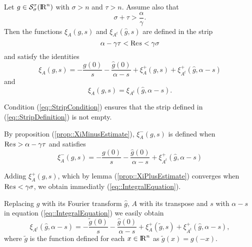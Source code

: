 \documentclass[12pt,a4paper]{amsart}
\begin{document}
{\begin{theorem}\label{thm::FunctionalEquation}
Let ${g}\in{{\mathcal{S}}_{\sigma}^{{\tau}}({{\rm I\kern-.185em R}}^{n})}$
with ${\sigma}>{n}$ and ${\tau}>{n}$.
Assume also that
\begin{equation}\label{eq::StripCondition}
{\sigma}+{\tau}>\frac{\alpha}{\gamma}.
\end{equation}
Then the  functions
${{\xi}_{{A}}\left({g},{s}\right)}$
and
${{\xi}_{{{\left.{{A}}\right.}^t}}\left({\hat{g}},{s}\right)}$
are defined in the strip
\begin{equation}\label{eq::StripDefinition}
{\alpha}-{\gamma}{\tau}<{\mathop{\rm Re}\nolimits}{s}<{\gamma}{\sigma}
\end{equation}
and satisfy the identities
\begin{equation}\label{eq::IntegralEquation}
{{\xi}_{{A}}\left({g},{s}\right)}=
-\frac{{g}(0)}{s}
-\frac{\hat{g}(0)}{{\alpha}-{s}}
+{{\xi}_{{A}}^+\left({g},{s}\right)}
+{{\xi}_{{{\left.{{A}}\right.}^t}}^+\left({\hat{g}},{{\alpha}-{s}}\right)}
\end{equation}
and
\begin{equation}\label{eq::FunctionalEquation}
{{\xi}_{{A}}\left({g},{s}\right)}=
{{\xi}_{{{\left.{{A}}\right.}^t}}\left({\hat{g}},{{\alpha}-{s}}\right)}.
\end{equation}
\end{theorem}

{\removelastskip\par\medskip\goodbreak{}}
Condition (\ref{eq::StripCondition}) ensures that the strip
defined in (\ref{eq::StripDefinition}) is not empty.

By proposition (\ref{prop::XiMinusEstimate}),
${{\xi}_{A}^-\left({g},{s}\right)}$ is defined
when ${\mathop{\rm Re}\nolimits}{s}>{\alpha}-{\gamma}{\tau}$
and satisfies
\begin{equation}\nonumber
{{\xi}_{A}^-\left({g},{s}\right)}=
	-\frac{{g}(0)}{s}
	-\frac{\hat{g}(0)}{{\alpha}-{s}}
	+{{\xi}_{{{\left.{{A}}\right.}^t}}^+\left({\hat{g}},{{\alpha}-{s}}\right)}
\end{equation}

Adding ${{\xi}_{{A}}^+\left({g},{s}\right)}$,
which by lemma (\ref{prop::XiPlusEstimate}) converges
when ${\mathop{\rm Re}\nolimits}{s}<{\gamma}{\sigma}$,
we obtain immediatly (\ref{eq::IntegralEquation}).

Replacing ${g}$ with its Fourier transform $\hat{g}$,
${A}$ with its transpose and
${s}$ with ${\alpha}-{s}$
in equation (\ref{eq::IntegralEquation}) we easily obtain
\begin{equation}\label{eq::IntegralEquationDual}
{{\xi}_{{{\left.{{A}}\right.}^t}}\left({\hat{g}},{{\alpha}-{s}}\right)}=
-\frac{\tilde{g}(0)}{s}
-\frac{\hat{g}(0)}{{\alpha}-{s}}
+{{\xi}_{{A}}^+\left({\tilde{g}},{s}\right)}
+{{\xi}_{{{\left.{{A}}\right.}^t}}^+\left({\hat{g}},{{\alpha}-{s}}\right)},
\end{equation}
where $\tilde{g}$ is the function defined for each
${x}\in{{\rm I\kern-.185em R}}^{n}$ as
$\tilde{g}({x})={g}(-{x})$.

}
\end{document}
